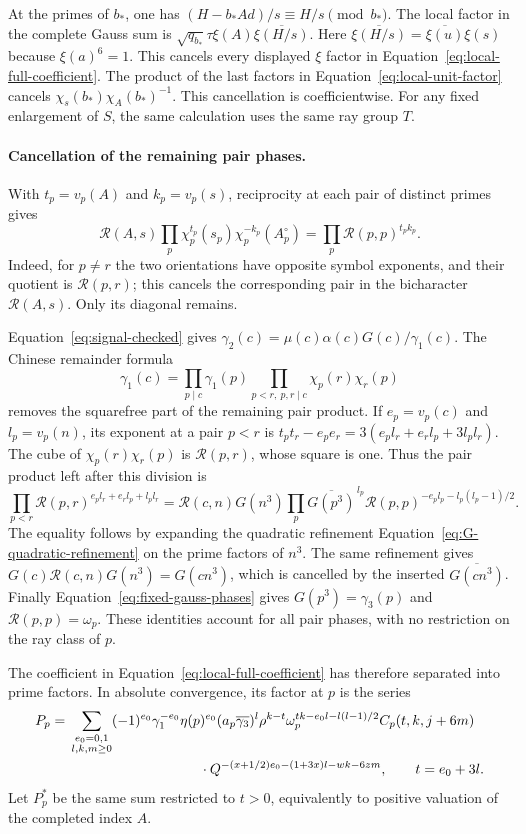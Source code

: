 \documentclass[12pt]{article}
\begin{document}
At the primes of $b_*$, one has
$(H-b_*Ad)/s\equiv H/s\pmod {b_*}$.  The local factor in the
complete Gauss sum is
$\sqrt{q_{b_*}}\tau\xi(A)\overline{\xi(H/s)}$.
Here $\overline{\xi(H/s)}=\overline{\xi(u)}\xi(s)$ because
$\xi(a)^6=1$.  This cancels every displayed $\xi$ factor in
Equation~\eqref{eq:local-full-coefficient}.  The product of the last
factors in Equation~\eqref{eq:local-unit-factor} cancels
$\chi_s(b_*)\chi_A(b_*)^{-1}$.  This cancellation is coefficientwise.
For any fixed enlargement of $S$, the same calculation uses the same
ray group $T$.

\paragraph{Cancellation of the remaining pair phases.}
With $t_p=v_p(A)$ and $k_p=v_p(s)$, reciprocity at each pair of
distinct primes gives
\[
 \mathcal R(A,s)\prod_p
       \chi_p^{t_p}(s_p)\chi_p^{-k_p}(A_p^\circ)
       =\prod_p\mathcal R(p,p)^{t_pk_p}.
\]
Indeed, for $p\ne r$ the two orientations have opposite symbol
exponents, and their quotient is $\mathcal R(p,r)$; this cancels
the corresponding pair in the bicharacter $\mathcal R(A,s)$.
Only its diagonal remains.

Equation~\eqref{eq:signal-checked} gives
$\gamma_2(c)=\mu(c)\alpha(c)G(c)/\gamma_1(c)$.
The Chinese remainder formula
\[
 \gamma_1(c)=\prod_{p\mid c}\gamma_1(p)
             \prod_{p<r,\ p,r\mid c}\chi_p(r)\chi_r(p)
\]
removes the squarefree part of the remaining pair product.  If
$e_p=v_p(c)$ and $l_p=v_p(n)$, its exponent at a pair $p<r$ is
$t_pt_r-e_pe_r=3(e_pl_r+e_rl_p+3l_pl_r)$.  The cube of
$\chi_p(r)\chi_r(p)$ is $\mathcal R(p,r)$, whose square is one.
Thus the pair product left after this division is
\[
 \prod_{p<r}\mathcal R(p,r)^{e_pl_r+e_rl_p+l_pl_r}
 =\mathcal R(c,n)G(n^3)
   \prod_p\overline{G(p^3)}^{\,l_p}
            \mathcal R(p,p)^{-e_pl_p-l_p(l_p-1)/2}.
\]
The equality follows by expanding the quadratic refinement
Equation~\eqref{eq:G-quadratic-refinement} on the prime factors of
$n^3$.  The same refinement gives
$G(c)\mathcal R(c,n)G(n^3)=G(cn^3)$, which is cancelled by the
inserted $\overline{G(cn^3)}$.  Finally
Equation~\eqref{eq:fixed-gauss-phases} gives
$G(p^3)=\gamma_3(p)$ and $\mathcal R(p,p)=\omega_p$.
These identities account for all pair phases, with no restriction
on the ray class of $p$.

The coefficient in Equation~\eqref{eq:local-full-coefficient}
has therefore separated into prime factors.  In absolute convergence,
its factor at $p$ is the series
\begin{equation}\label{eq:local-P}
\begin{aligned}
 P_p={}&\sum_{\substack{e_0=0,1\\l,k,m\ge0}}
 (-1)^{e_0}\gamma_1^{-e_0}\eta(p)^{e_0}
 (a_p\overline{\gamma_3})^l\rho^{k-t}
 \omega_p^{tk-e_0l-l(l-1)/2}C_p(t,k,j+6m)\\
 &\hspace{33mm}\cdot
 Q^{-(x+1/2)e_0-(1+3x)l-wk-6zm},\qquad t=e_0+3l.
\end{aligned}
\end{equation}
Let $P_p^*$ be the same sum restricted to $t>0$, equivalently to
positive valuation of the completed index $A$.
\end{document}
